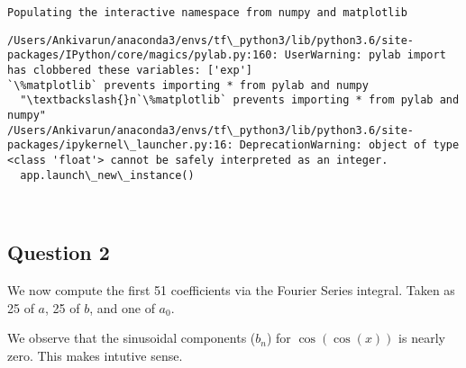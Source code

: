 \documentclass[11pt]{article}
\begin{document}
    \begin{Verbatim}[commandchars=\\\{\}]
Populating the interactive namespace from numpy and matplotlib

    \end{Verbatim}

    \begin{Verbatim}[commandchars=\\\{\}]
/Users/Ankivarun/anaconda3/envs/tf\_python3/lib/python3.6/site-packages/IPython/core/magics/pylab.py:160: UserWarning: pylab import has clobbered these variables: ['exp']
`\%matplotlib` prevents importing * from pylab and numpy
  "\textbackslash{}n`\%matplotlib` prevents importing * from pylab and numpy"
/Users/Ankivarun/anaconda3/envs/tf\_python3/lib/python3.6/site-packages/ipykernel\_launcher.py:16: DeprecationWarning: object of type <class 'float'> cannot be safely interpreted as an integer.
  app.launch\_new\_instance()

    \end{Verbatim}

    \begin{center}
    \end{center}
    { \hspace*{\fill} \\}
    
    \hypertarget{question-2}{%
\subsection{Question 2}\label{question-2}}

We now compute the first 51 coefficients via the Fourier Series
integral. Taken as 25 of \(a\), 25 of \(b\), and one of \(a_0\).

We observe that the sinusoidal components (\(b_n\)) for
\(\cos{(\cos{(x)})}\) is nearly zero. This makes intutive sense.
\end{document}
